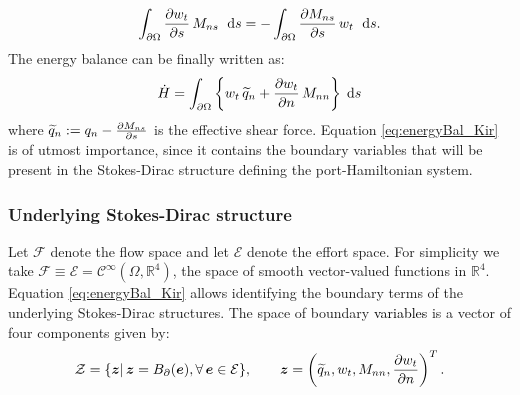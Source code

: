 \documentclass[11pt]{article}
\newcommand{\revOne}[1]{\textcolor{black}{#1}}
\begin{document}
	\begin{equation}
	\int_{\partial \Omega} \diffp{w_t}{s} \, M_{ns} \ \d{s}= - \int_{\partial \Omega} \diffp{M_{ns}}{s} \, w_t \ \d{s}.
	\end{equation}
	The energy balance can be finally written as:
	\begin{equation}
	\label{eq:energyBal_Kir}
	\dot{H} = \int_{\partial \Omega} \left\{ w_t \, \widetilde{q}_n + \diffp{w_t}{n} \, M_{nn}\right\} \d{s}
	\end{equation} 
	where $\widetilde{q}_n := q_n - \diffp{M_{ns}}{s}$ is the effective shear force.
	Equation \eqref{eq:energyBal_Kir} is of utmost importance, since it contains the boundary variables that will be present in the Stokes-Dirac structure defining the port-Hamiltonian system.
	
	\subsubsection{Underlying Stokes-Dirac structure} 
	
	Let $\mathcal{F}$ denote the flow space and let $\mathcal{E}$ denote the effort space. For simplicity we take  $\mathcal{F} \equiv  \mathcal{E} = \mathcal{C}^\infty(\Omega, \mathbb{R}^4)$, the space of smooth vector-valued functions in $\mathbb{R}^4$. Equation \eqref{eq:energyBal_Kir} allows identifying the boundary terms of the underlying Stokes-Dirac structures. The space of boundary \revOne{variables} is a vector of four components given by:
	\begin{equation*}
	\mathcal{Z} = \{\bm{z} | \, \bm{z} = B_{\partial}(\bm{e}), \forall \, \bm{e} \in \mathcal{E} \},  \qquad \bm{z} = \left( \widetilde{q}_n, w_t, M_{nn}, \diffp{w_t}{n} \right)^T .
	\end{equation*}
	
\end{document}

